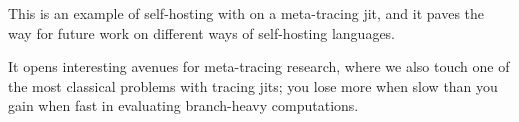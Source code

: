         \begin{paragraph-here}%
            This is an example of self-hosting with on a meta-tracing \gls{jit}, and it paves the way for future work on different ways of self-hosting languages.
        \end{paragraph-here}

        \begin{paragraph-here}%
            It opens interesting avenues for meta-tracing research, where we also touch one of the most classical problems with tracing \glspl{jit}; you lose more when slow than you gain when fast in evaluating branch-heavy computations.
        \end{paragraph-here}
